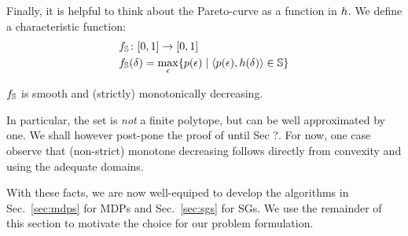 Finally, it is helpful to think about the Pareto-curve as a function in $h$.  We define a
characteristic function:
\begin{equation}
  \begin{split}
    & f_\mathbb{S}\colon [0,1] \rightarrow [0, 1]    \\
    & f_\mathbb{S}(\delta) = \max_\epsilon \{ p(\epsilon) \mid \langle
    p(\epsilon), h(\delta) \rangle \in \mathbb{S} \} 
  \end{split}
\end{equation}
\begin{proposition}\label{prop:monotone}
  $f_\mathbb{S}$ is smooth and (strictly) monotonically decreasing.
\end{proposition}
In particular, the set is \emph{not} a finite polytope, but can be
well approximated by one. We shall however post-pone the proof of
 until Sec ?. For now, one case observe that
(non-strict) monotone decreasing follows directly from convexity and
using the adequate domains.


With these facts, we are now well-equiped to develop the algorithms in Sec.~\ref{sec:mdps} for MDPs and Sec.~\ref{sec:sgs} for SGs.
We use the remainder of this section to motivate the choice for our problem formulation.



